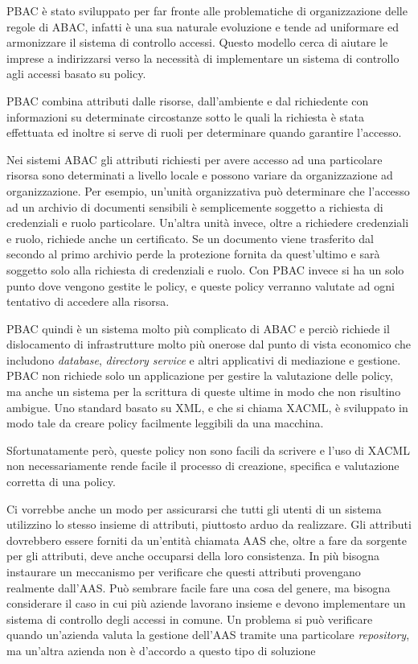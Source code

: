 \ac{PBAC} è stato sviluppato per far fronte alle problematiche di organizzazione delle regole di \ac{ABAC}, infatti è una sua naturale evoluzione e tende ad uniformare ed armonizzare il sistema di controllo accessi.
Questo modello cerca di aiutare le imprese a indirizzarsi verso la necessità di implementare un sistema di controllo agli accessi basato su policy.\par
\ac{PBAC} combina attributi dalle risorse, dall'ambiente e dal richiedente con informazioni su determinate circostanze sotto le quali la richiesta è stata effettuata ed inoltre si serve di 
ruoli per determinare quando garantire l'accesso.\par
Nei sistemi \ac{ABAC} gli attributi richiesti per avere accesso ad una particolare risorsa sono determinati a livello locale e possono variare da organizzazione ad organizzazione.
Per esempio, un'unità organizzativa può determinare che l'accesso ad un archivio di documenti sensibili è semplicemente soggetto a richiesta di credenziali e ruolo particolare.
Un'altra unità invece, oltre a richiedere credenziali e ruolo, richiede anche un certificato. Se un documento viene trasferito dal secondo al primo archivio perde la protezione fornita da quest'ultimo e sarà soggetto solo alla richiesta di credenziali e ruolo.
Con \ac{PBAC} invece si ha un solo punto dove vengono gestite le policy, e queste policy verranno valutate ad ogni tentativo di accedere alla risorsa.\par
\ac{PBAC} quindi è un sistema molto più complicato di \ac{ABAC} e perciò richiede il dislocamento di infrastrutture molto più onerose dal punto di vista economico che includono \textit{database}, \textit{directory service} e altri applicativi di mediazione e gestione.
\ac{PBAC} non richiede solo un applicazione per gestire la valutazione delle policy, ma
anche un sistema per la scrittura di queste ultime in modo che
non risultino ambigue.
Uno standard basato su \ac{XML}, e che si chiama \ac{XACML}, è sviluppato in modo tale da creare policy facilmente leggibili da una macchina. \par

Sfortunatamente però, queste policy non sono facili da scrivere e l’uso
di \ac{XACML} non necessariamente rende facile il processo di creazione, specifica e valutazione corretta di una policy. \par
Ci vorrebbe anche un modo per assicurarsi che tutti gli utenti di un sistema utilizzino lo stesso insieme di attributi, piuttosto arduo da realizzare. Gli attributi dovrebbero essere forniti da un’entità chiamata
\ac{AAS} che, oltre a fare da sorgente per gli
attributi, deve anche occuparsi della loro consistenza. In più bisogna instaurare
un meccanismo per verificare che questi attributi provengano
realmente dall’\ac{AAS}. Può sembrare facile fare una cosa del genere, ma
bisogna considerare il caso in cui più aziende lavorano insieme e devono
implementare un sistema di controllo degli accessi in comune. Un problema
si può verificare quando un’azienda valuta la gestione dell’\ac{AAS}
tramite una particolare \textit{repository}, ma un’altra azienda non è d’accordo a
questo tipo di soluzione

